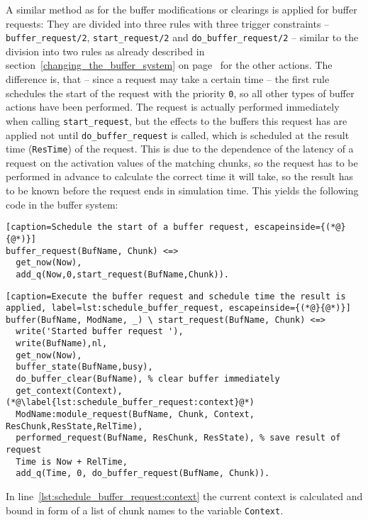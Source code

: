 A similar method as for the buffer modifications or clearings is applied for buffer requests: They are divided into three rules with three trigger constraints -- \lstinline|buffer_request/2|, \lstinline|start_request/2| and \lstinline|do_buffer_request/2| -- similar to the division into two rules as already described in section~\ref{changing_the_buffer_system} on page~\pageref{changing_the_buffer_system} for the other actions. The difference is, that -- since a request may take a certain time -- the first rule schedules the start of the request with the priority \lstinline|0|, so all other types of buffer actions have been performed. The request is actually performed immediately when calling \lstinline|start_request|, but the effects to the buffers this request has are applied not until \lstinline|do_buffer_request| is called, which is scheduled at the result time (\lstinline|ResTime|) of the request. This is due to the dependence of the latency of a request on the activation values of the matching chunks, so the request has to be performed in advance to calculate the correct time it will take, so the result has to be known before the request ends in simulation time. This yields the following code in the buffer system:

\begin{lstlisting}[caption=Schedule the start of a buffer request, escapeinside={(*@}{@*)}]
buffer_request(BufName, Chunk) <=>
  get_now(Now),
  add_q(Now,0,start_request(BufName,Chunk)).
\end{lstlisting}

\begin{lstlisting}[caption=Execute the buffer request and schedule time the result is applied, label=lst:schedule_buffer_request, escapeinside={(*@}{@*)}]
buffer(BufName, ModName, _) \ start_request(BufName, Chunk) <=> 
  write('Started buffer request '),
  write(BufName),nl,
  get_now(Now),
  buffer_state(BufName,busy),
  do_buffer_clear(BufName), % clear buffer immediately
  get_context(Context), (*@\label{lst:schedule_buffer_request:context}@*)
  ModName:module_request(BufName, Chunk, Context, ResChunk,ResState,RelTime),
  performed_request(BufName, ResChunk, ResState), % save result of request
  Time is Now + RelTime, 
  add_q(Time, 0, do_buffer_request(BufName, Chunk)).
\end{lstlisting}

In line~\ref{lst:schedule_buffer_request:context} the current context is calculated and bound in form of a list of chunk names to the variable \lstinline|Context|.
  
